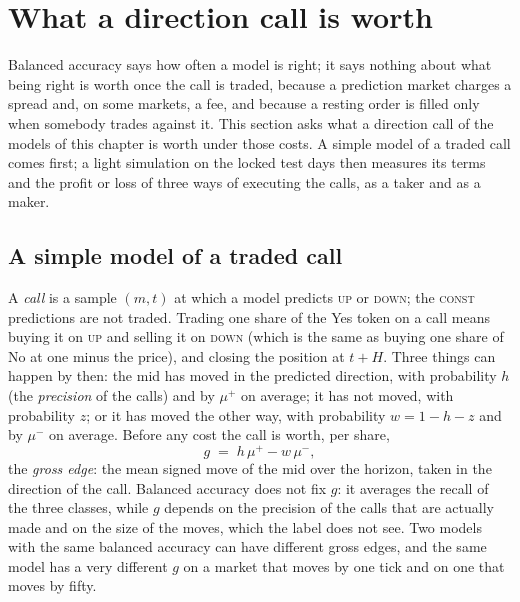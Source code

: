 \section{What a direction call is worth}
\label{sec:exp:econ}

Balanced accuracy says how often a model is right; it says nothing about what being right is
worth once the call is traded, because a prediction market charges a spread and, on some
markets, a fee, and because a resting order is filled only when somebody trades against it.
This section asks what a direction call of the models of this chapter is worth under those
costs.  A simple model of a traded call comes first; a light simulation on the locked test
days then measures its terms and the profit or loss of three ways of executing the calls,
as a taker and as a maker.

\subsection{A simple model of a traded call}
\label{sec:econ:model}

A \emph{call} is a sample $(m, t)$ at which a model predicts \textsc{up} or \textsc{down};
the \textsc{const} predictions are not traded.  Trading one share of the Yes token on a call
means buying it on \textsc{up} and selling it on \textsc{down} (which is the same as buying
one share of No at one minus the price), and closing the position at $t + H$.  Three things
can happen by then: the mid has moved in the predicted direction, with probability $h$ (the
\emph{precision} of the calls) and by $\mu^{+}$ on average; it has not moved, with
probability $z$; or it has moved the other way, with probability $w = 1 - h - z$ and by
$\mu^{-}$ on average.  Before any cost the call is worth, per share,
\begin{equation}
  g \;=\; h\,\mu^{+} - w\,\mu^{-},
  \label{eq:econ:edge}
\end{equation}
the \emph{gross edge}: the mean signed move of the mid over the horizon, taken in the
direction of the call.  Balanced accuracy does not fix $g$: it averages the recall of the
three classes, while $g$ depends on the precision of the calls that are actually made and on
the size of the moves, which the label does not see.  Two models with the same balanced
accuracy can have different gross edges, and the same model has a very different $g$ on a
market that moves by one tick and on one that moves by fifty.

